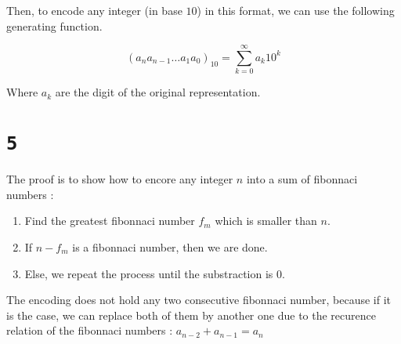 \documentclass[a4paper,11pt]{report}
\begin{document}
Then, to encode any integer (in base $10$) in this format, we can use the following generating
function.

\[
  (a_na_{n-1}\dots a_1a_0)_{10} = \sum_{k=0}^{\infty} a_k10^k
\]

Where $a_k$ are the digit of the original representation.

\section*{\texttt{5}}

The proof is to show how to encore any integer $n$ into a sum of fibonnaci numbers :
\begin{enumerate}
\item Find the greatest fibonnaci number $f_m$ which is smaller than $n$.
\item If $n - f_m$ is a fibonnaci number, then we are done.
\item Else, we repeat the process until the substraction is $0$.
\end{enumerate}

The encoding does not hold any two consecutive fibonnaci number, because if it
is the case, we can replace both of them by another one due to the recurence
relation of the fibonnaci numbers : $a_{n-2} + a_{n-1} = a_n$
\end{document}
